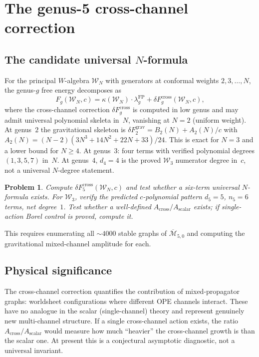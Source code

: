 \documentclass[11pt]{amsart}
\newcommand{\cM}{\mathcal{M}}
\newcommand{\cW}{\mathcal{W}}
\theoremstyle{plain}
\newtheorem{problem}[theorem]{Problem}
\theoremstyle{definition}
\theoremstyle{remark}
\begin{document}
\section{The genus-5 cross-channel correction}

\subsection{The candidate universal $N$-formula}

For the principal $W$-algebra $\cW_N$ with generators at
conformal weights $2, 3, \ldots, N$, the genus-$g$ free energy
decomposes as
\[
F_g(\cW_N, c)
= \kappa(\cW_N) \cdot \lambda_g^{\mathrm{FP}}
+ \delta F_g^{\mathrm{cross}}(\cW_N, c),
\]
where the cross-channel correction $\delta F_g^{\mathrm{cross}}$
is computed in low genus and may admit universal polynomial
skeleta in~$N$, vanishing at $N = 2$ (uniform weight). At
genus~$2$ the gravitational skeleton is
$\delta F_2^{\mathrm{grav}} = B_2(N) + A_2(N)/c$ with
$A_2(N) = (N{-}2)(3N^3{+}14N^2{+}22N{+}33)/24$.
This is exact for $N=3$ and a lower bound for $N\geq4$.
At genus~$3$: four terms with verified polynomial degrees
$(1,3,5,7)$ in~$N$.  At genus~$4$, $d_4=4$ is the proved
$\cW_3$ numerator degree in~$c$, not a universal $N$-degree
statement.

\begin{problem}
Compute $\delta F_5^{\mathrm{cross}}(\cW_N, c)$ and test whether
a six-term universal $N$-formula exists.  For $\cW_3$, verify the
predicted $c$-polynomial pattern $d_5 = 5$, $n_5 = 6$ terms, net
degree~$1$.
Test whether a well-defined $A_{\mathrm{cross}}/A_{\mathrm{scalar}}$
exists; if single-action Borel control is proved, compute it.
\end{problem}

This requires enumerating all ${\sim}4000$ stable graphs of
$\overline{\cM}_{5,0}$ and computing the gravitational
mixed-channel amplitude for each.

\subsection{Physical significance}

The cross-channel correction quantifies the contribution of
mixed-propagator graphs: worldsheet configurations where
different OPE channels interact. These have no analogue in
the scalar (single-channel) theory and represent genuinely new
multi-channel structure.  If a single cross-channel action exists,
the ratio $A_{\mathrm{cross}}/A_{\mathrm{scalar}}$ would measure
how much ``heavier'' the cross-channel growth is than the scalar
one.  At present this is a conjectural asymptotic diagnostic, not a
universal invariant.
\end{document}
